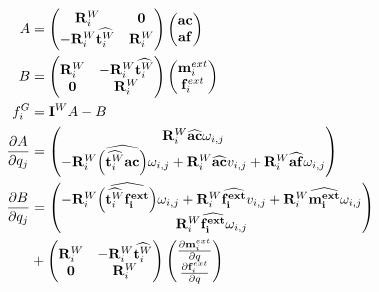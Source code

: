 \begin{align}
  A &=
  \begin{pmatrix}
    {\mathbf{R}^W_i} & \mathbf{0} \\
    -{\mathbf{R}^W_i}\widehat{\mathbf{t}^W_i} & {\mathbf{R}^W_i} \\
  \end{pmatrix}
  \begin{pmatrix}
    \mathbf{ac} \\ \mathbf{af}
  \end{pmatrix} \\
  B &=
  \begin{pmatrix}
    {\mathbf{R}^W_i} & -{\mathbf{R}^W_i}\widehat{\mathbf{t}^W_i} \\
    \mathbf{0} & {\mathbf{R}^W_i} \\
  \end{pmatrix}
  \begin{pmatrix}
    \mathbf{m}^{ext}_i \\ \mathbf{f}^{ext}_i
  \end{pmatrix} \\
  f^G_i &= \mathbf{I}^WA-B\\
  \frac{\partial A}{\partial q_j} &=
  \begin{pmatrix}
    \mathbf{R}^W_i \widehat{\bf ac} \omega_{i,j}\\
    -{\mathbf{R}^W_i}\widehat{\left(\widehat{\mathbf{t}^W_i}\bf ac \right)}\omega_{i,j}
    + {\mathbf{R}^W_i}\widehat{\bf ac} v_{i,j} + \mathbf{R}^W_i \widehat{\bf af} \omega_{i,j}\\
  \end{pmatrix}
  \\
  \frac{\partial B}{\partial q_j} &=
  \begin{pmatrix}
    - {\mathbf{R}^W_i}\widehat{\left(\widehat{\mathbf{t}^W_i}\bf \mathbf{f}^{ext}_i \right)}\omega_{i,j}
    + {\mathbf{R}^W_i}\widehat{\bf \mathbf{f}^{ext}_i} v_{i,j} + \mathbf{R}^W_i \widehat{\bf \mathbf{m}^{ext}_i} \omega_{i,j}\\
    \mathbf{R}^W_i \widehat{\bf \mathbf{f}^{ext}_i} \omega_{i,j}\\
  \end{pmatrix}
  \\&+
  \begin{pmatrix}
    {\mathbf{R}^W_i} & -{\mathbf{R}^W_i}\widehat{\mathbf{t}^W_i} \\
    \mathbf{0} & {\mathbf{R}^W_i} \\
  \end{pmatrix}
  \begin{pmatrix}
    \frac{\partial \mathbf{m}^{ext}_i}{\partial q} \\ \frac{\partial \mathbf{f}^{ext}_i}{\partial q}
  \end{pmatrix}
\end{align}

